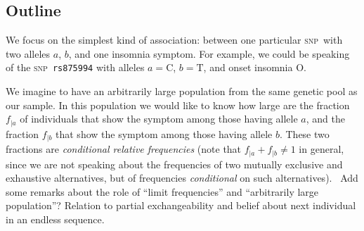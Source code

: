 \documentclass[\ifafour a4paper,12pt,\else a5paper,10pt,\fi%
onecolumn,oneside,article,%
british%
]{memoir}
\theoremstyle{remark}
\theoremstyle{innote}
\renewcommand*{\|}{\mathpunct{|}}
\newcommand*{\puzzle}{\maltese}
\newcommand{\mynote}[1]{ {\color{notecolour}\puzzle\ #1}}
\newcommand*{\rs}{\texttt}
\newcommand*{\snp}{\textsc{snp}}
\newcommand*{\ya}{a}
\newcommand*{\yb}{b}
\newcommand*{\ysA}{\textrm{O}}%
\begin{document}
\subsection{Outline}
\label{sec:method_outline}

We focus on the simplest kind of association: between one particular \snp\
with two alleles $\ya$, $\yb$, and one insomnia symptom. For example, we
could be speaking of the \snp\ \rs{rs875994} with alleles $\ya=\textrm{C}$,
$\yb=\textrm{T}$, and onset insomnia $\ysA$.

We imagine to have an arbitrarily large population from the same genetic
pool as our sample. In this population we would like to know how large are
the fraction $f_{|\ya}$ of individuals that show the symptom among those
having allele $\ya$, and the fraction $f_{|\yb}$ that show the symptom among
those having allele $\yb$. These two fractions are \emph{conditional
  relative frequencies} (note that $f_{|\ya}+f_{|\yb} \ne 1$ in general,
since we are not speaking about the frequencies of two mutually exclusive
and exhaustive alternatives, but of frequencies \emph{conditional} on such
alternatives). \mynote{Add some remarks about the role of \enquote{limit
    frequencies} and \enquote{arbitrarily large population}? Relation to
  partial exchangeability and belief about next individual in an endless
  sequence.}
\end{document}
